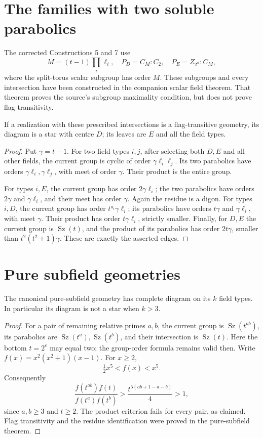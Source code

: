 \documentclass[11pt,a4paper]{article}
\newcommand{\Sz}{\operatorname{Sz}}
\begin{document}
\section{The families with two soluble parabolics}
The corrected Constructions 5 and 7 use
\[
 M=(t-1)\prod_i\ell_i,\quad
 P_D=C_M:C_2,\quad P_E=Z_{2^n}:C_M,
\]
where the split-torus scalar subgroup has order $M$. These subgroups
and every intersection have been constructed in the companion scalar
field theorem. That theorem proves the source's subgroup maximality
condition, but does not prove flag transitivity.
\begin{proposition}
If a realization with these prescribed intersections is a
flag-transitive geometry, its diagram is a star with centre $D$;
its leaves are $E$ and all the field types.
\end{proposition}
\begin{proof}
Put $\gamma=t-1$. For two field types $i,j$, after selecting both
$D,E$ and all other fields, the current group is cyclic of order
$\gamma\ell_i\ell_j$. Its two parabolics have orders
$\gamma\ell_i,\gamma\ell_j$, with meet of order $\gamma$.
Their product is the entire group.

For types $i,E$, the current group has order $2\gamma\ell_i$;
the two parabolics have orders $2\gamma$ and $\gamma\ell_i$,
and their meet has order $\gamma$. Again the residue is a digon.
For types $i,D$, the current group has order
$t^{a_i}\gamma\ell_i$; its parabolics have orders
$t\gamma$ and $\gamma\ell_i$, with meet $\gamma$.
Their product has order $t\gamma\ell_i$, strictly smaller.
Finally, for $D,E$ the current group is $\Sz(t)$, and the product
of its parabolics has order $2t\gamma$, smaller than
$t^2(t^2+1)\gamma$. These are exactly the asserted edges.
\end{proof}

\section{Pure subfield geometries}
\begin{proposition}
The canonical pure-subfield geometry has complete diagram on its
$k$ field types. In particular its diagram is not a star when $k>3$.
\end{proposition}
\begin{proof}
For a pair of remaining relative primes $a,b$, the current group
is $\Sz(t^{ab})$, its parabolics are $\Sz(t^a),\Sz(t^b)$,
and their intersection is $\Sz(t)$. Here the bottom $t=2^e$
may equal two; the group-order formula remains valid then.
Write $f(x)=x^2(x^2+1)(x-1)$. For $x\ge2$,
\[
 \tfrac12 x^5<f(x)<x^5.
\]
Consequently
\[
 \frac{f(t^{ab})f(t)}{f(t^a)f(t^b)}
 >\frac{t^{5(ab+1-a-b)}}4>1,
\]
since $a,b\ge3$ and $t\ge2$. The product criterion fails for
every pair, as claimed. Flag transitivity and the residue identification
were proved in the pure-subfield theorem.
\end{proof}
\end{document}
